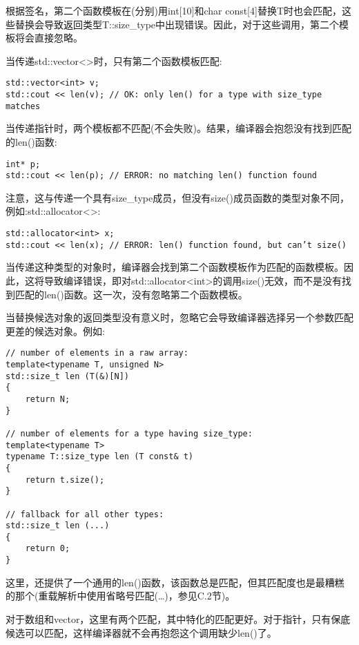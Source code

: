 根据签名，第二个函数模板在(分别)用int[10]和char const[4]替换T时也会匹配，这些替换会导致返回类型T::size\_type中出现错误。因此，对于这些调用，第二个模板将会直接忽略。

当传递std::vector<>时，只有第二个函数模板匹配:

\begin{lstlisting}[style=styleCXX]
std::vector<int> v;
std::cout << len(v); // OK: only len() for a type with size_type matches
\end{lstlisting}

当传递指针时，两个模板都不匹配(不会失败)。结果，编译器会抱怨没有找到匹配的len()函数:

\begin{lstlisting}[style=styleCXX]
int* p;
std::cout << len(p); // ERROR: no matching len() function found
\end{lstlisting}

注意，这与传递一个具有size\_type成员，但没有size()成员函数的类型对象不同，例如:std::allocator<>:

\begin{lstlisting}[style=styleCXX]
std::allocator<int> x;
std::cout << len(x); // ERROR: len() function found, but can’t size()
\end{lstlisting}

当传递这种类型的对象时，编译器会找到第二个函数模板作为匹配的函数模板。因此，这将导致编译错误，即对std::allocator<int>的调用size()无效，而不是没有找到匹配的len()函数。这一次，没有忽略第二个函数模板。

当替换候选对象的返回类型没有意义时，忽略它会导致编译器选择另一个参数匹配更差的候选对象。例如:

\begin{lstlisting}[style=styleCXX]
// number of elements in a raw array:
template<typename T, unsigned N>
std::size_t len (T(&)[N])
{
	return N;
}

// number of elements for a type having size_type:
template<typename T>
typename T::size_type len (T const& t)
{
	return t.size();
}

// fallback for all other types:
std::size_t len (...)
{
	return 0;
}
\end{lstlisting}

这里，还提供了一个通用的len()函数，该函数总是匹配，但其匹配度也是最糟糕的那个(重载解析中使用省略号匹配(…)，参见C.2节)。

对于数组和vector，这里有两个匹配，其中特化的匹配更好。对于指针，只有保底候选可以匹配，这样编译器就不会再抱怨这个调用缺少len()了。

